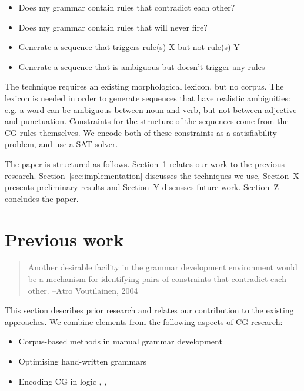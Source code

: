 \begin{itemize}
\item Does my grammar contain rules that contradict each other?
\item Does my grammar contain rules that will never fire?
\item Generate a sequence that triggers rule(s) X but not rule(s) Y
\item Generate a sequence that is ambiguous but doesn't trigger any rules
\end{itemize}

The technique requires an existing morphological lexicon, but no corpus. 
The lexicon is needed in order to generate sequences that have realistic ambiguities: e.g. a word can be ambiguous between noun and verb, but not between adjective and punctuation. 
Constraints for the structure of the sequences come from the CG rules themselves.
We encode both of these constraints as a satisfiability problem, and use a SAT solver.

The paper is structured as follows. Section~\ref{sec:prev} relates our work to the previous research. Section~\ref{sec:implementation} discusses the techniques we use, Section~X presents preliminary results and  Section~Y discusses future work. Section~Z concludes the paper.







\section{Previous work}
\label{sec:prev}

\begin{quote}Another desirable facility in the grammar development environment would
be a mechanism for identifying pairs of constraints that contradict each
other.
--Atro Voutilainen, 2004
\end{quote}

This section describes prior research and relates our contribution to the existing approaches.
We combine elements from the following aspects of CG research:

\begin{itemize}
\item Corpus-based methods in manual grammar development \cite{voutilainen2004}
\item Optimising hand-written grammars \cite{bick2013tuning}
\item Encoding CG in logic \cite{lager98}, \cite{lager_nivre01}, \cite{listenmaa_claessen2015}
\end{itemize}

